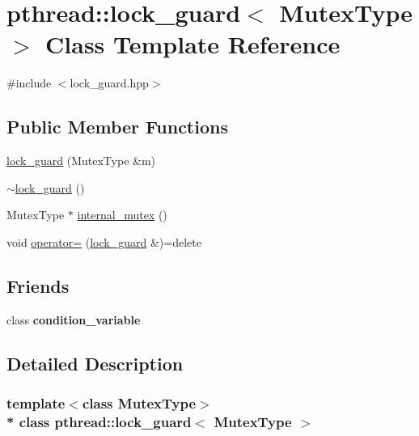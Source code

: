 \hypertarget{classpthread_1_1lock__guard}{}\section{pthread\+:\+:lock\+\_\+guard$<$ Mutex\+Type $>$ Class Template Reference}
\label{classpthread_1_1lock__guard}


{\ttfamily \#include $<$lock\+\_\+guard.\+hpp$>$}

\subsection*{Public Member Functions}
\begin{DoxyCompactItemize}
\item 
\hyperlink{classpthread_1_1lock__guard_a5298f98a23bc7d7fe4fc9636f989ad65}{lock\+\_\+guard} (Mutex\+Type \&m)
\item 
\hyperlink{classpthread_1_1lock__guard_a958884251adfb8d5f9bd7d643cc3949f}{$\sim$lock\+\_\+guard} ()
\item 
Mutex\+Type $\ast$ \hyperlink{classpthread_1_1lock__guard_a0aeeee216e7b322845678cf59990351b}{internal\+\_\+mutex} ()
\item 
void \hyperlink{classpthread_1_1lock__guard_a1f9ab705f7ffe9eb8739ff3cf34cf7f2}{operator=} (\hyperlink{classpthread_1_1lock__guard}{lock\+\_\+guard} \&)=delete
\end{DoxyCompactItemize}
\subsection*{Friends}
\begin{DoxyCompactItemize}
\item 
class {\bfseries condition\+\_\+variable}\hypertarget{classpthread_1_1lock__guard_a89c9b6aa2256fa5efd92a333d96381d4}{}\label{classpthread_1_1lock__guard_a89c9b6aa2256fa5efd92a333d96381d4}

\end{DoxyCompactItemize}


\subsection{Detailed Description}
\subsubsection*{template$<$class Mutex\+Type$>$\\*
class pthread\+::lock\+\_\+guard$<$ Mutex\+Type $>$}

